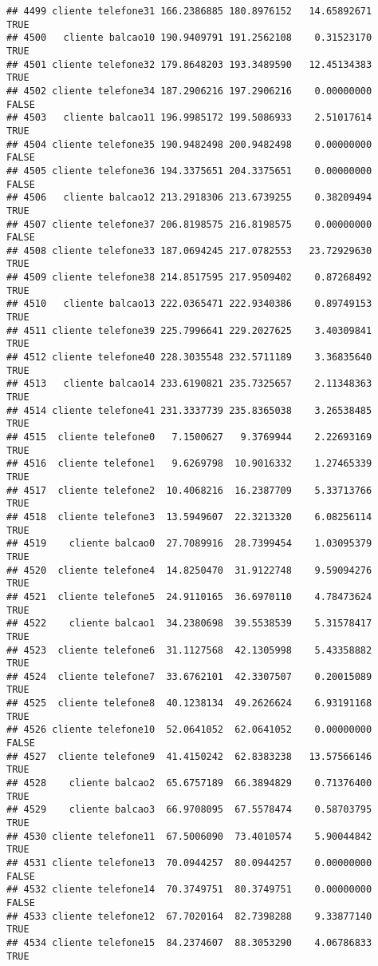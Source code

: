 \documentclass[
]{article}
\begin{document}
\begin{verbatim}
## 4499 cliente telefone31 166.2386885 180.8976152   14.65892671     TRUE
## 4500   cliente balcao10 190.9409791 191.2562108    0.31523170     TRUE
## 4501 cliente telefone32 179.8648203 193.3489590   12.45134383     TRUE
## 4502 cliente telefone34 187.2906216 197.2906216    0.00000000    FALSE
## 4503   cliente balcao11 196.9985172 199.5086933    2.51017614     TRUE
## 4504 cliente telefone35 190.9482498 200.9482498    0.00000000    FALSE
## 4505 cliente telefone36 194.3375651 204.3375651    0.00000000    FALSE
## 4506   cliente balcao12 213.2918306 213.6739255    0.38209494     TRUE
## 4507 cliente telefone37 206.8198575 216.8198575    0.00000000    FALSE
## 4508 cliente telefone33 187.0694245 217.0782553   23.72929630     TRUE
## 4509 cliente telefone38 214.8517595 217.9509402    0.87268492     TRUE
## 4510   cliente balcao13 222.0365471 222.9340386    0.89749153     TRUE
## 4511 cliente telefone39 225.7996641 229.2027625    3.40309841     TRUE
## 4512 cliente telefone40 228.3035548 232.5711189    3.36835640     TRUE
## 4513   cliente balcao14 233.6190821 235.7325657    2.11348363     TRUE
## 4514 cliente telefone41 231.3337739 235.8365038    3.26538485     TRUE
## 4515  cliente telefone0   7.1500627   9.3769944    2.22693169     TRUE
## 4516  cliente telefone1   9.6269798  10.9016332    1.27465339     TRUE
## 4517  cliente telefone2  10.4068216  16.2387709    5.33713766     TRUE
## 4518  cliente telefone3  13.5949607  22.3213320    6.08256114     TRUE
## 4519    cliente balcao0  27.7089916  28.7399454    1.03095379     TRUE
## 4520  cliente telefone4  14.8250470  31.9122748    9.59094276     TRUE
## 4521  cliente telefone5  24.9110165  36.6970110    4.78473624     TRUE
## 4522    cliente balcao1  34.2380698  39.5538539    5.31578417     TRUE
## 4523  cliente telefone6  31.1127568  42.1305998    5.43358882     TRUE
## 4524  cliente telefone7  33.6762101  42.3307507    0.20015089     TRUE
## 4525  cliente telefone8  40.1238134  49.2626624    6.93191168     TRUE
## 4526 cliente telefone10  52.0641052  62.0641052    0.00000000    FALSE
## 4527  cliente telefone9  41.4150242  62.8383238   13.57566146     TRUE
## 4528    cliente balcao2  65.6757189  66.3894829    0.71376400     TRUE
## 4529    cliente balcao3  66.9708095  67.5578474    0.58703795     TRUE
## 4530 cliente telefone11  67.5006090  73.4010574    5.90044842     TRUE
## 4531 cliente telefone13  70.0944257  80.0944257    0.00000000    FALSE
## 4532 cliente telefone14  70.3749751  80.3749751    0.00000000    FALSE
## 4533 cliente telefone12  67.7020164  82.7398288    9.33877140     TRUE
## 4534 cliente telefone15  84.2374607  88.3053290    4.06786833     TRUE

\end{verbatim}
\end{document}
